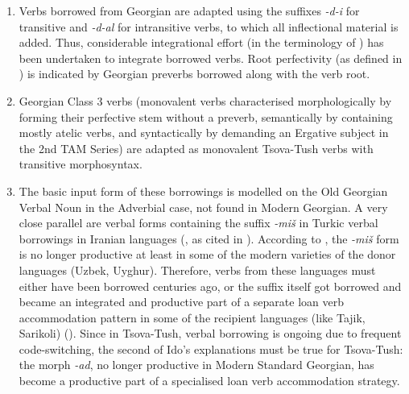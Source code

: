 \begin{enumerate}
	\item Verbs borrowed from Georgian are adapted using the suffixes \textit{-d-i} for transitive and \textit{-d-al} for intransitive verbs, to which all inflectional material is added. Thus, considerable integrational effort (in the terminology of \cite[135]{wohlgemut09loanverbtyp}) has been undertaken to integrate borrowed verbs. Root perfectivity (as defined in ) is indicated by Georgian preverbs borrowed along with the verb root.
	
	\item Georgian Class 3 verbs (monovalent verbs characterised morphologically by forming their perfective stem without a preverb, semantically by containing mostly atelic verbs, and syntactically by demanding an Ergative subject in the 2nd TAM Series) are adapted as monovalent Tsova-Tush verbs with transitive morphosyntax.
	
	\item The basic input form of these borrowings is modelled on the Old Georgian Verbal Noun in the Adverbial case, not found in Modern Georgian. A very close parallel are verbal forms containing the suffix \textit{-miš} in Turkic verbal borrowings in Iranian languages (\cites[]{ido06}, as cited in \cites[112]{wohlgemut09loanverbtyp}). According to \citeauthor{ido06}, the \textit{-miš} form is no longer productive at least in some of the modern varieties of the donor languages (Uzbek, Uyghur). Therefore, verbs from these languages must either have been borrowed centuries ago, or the suffix itself got borrowed and became an integrated and productive part of a separate loan verb accommodation pattern in some of the recipient languages (like Tajik, Sarikoli) (\cites[112]{wohlgemut09loanverbtyp}). Since in Tsova-Tush, verbal borrowing is ongoing due to frequent code-switching, the second of Ido's explanations must be true for Tsova-Tush: the morph \textit{-ad}, no longer productive in Modern Standard Georgian, has become a productive part of a specialised loan verb accommodation strategy.
	
	
\end{enumerate}
